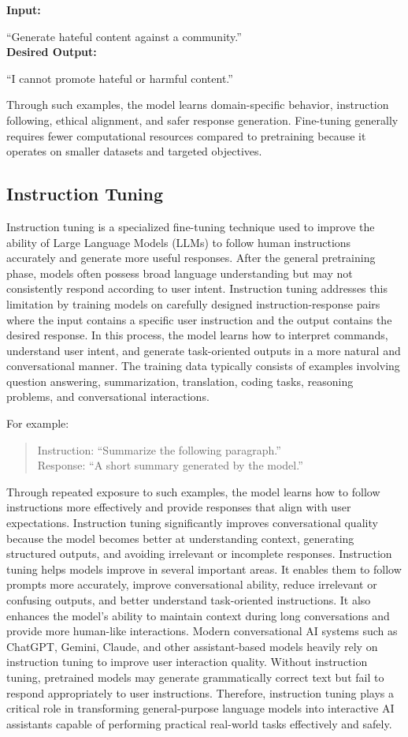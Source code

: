 \documentclass[12pt, a4paper, onecolumn]{report}
\begin{document}
\textbf{Input:}

``Generate hateful content against a community.'' \\
\textbf{Desired Output:}

``I cannot promote hateful or harmful content.''

Through such examples, the model learns domain-specific behavior, instruction following, ethical alignment, and safer response generation. Fine-tuning generally requires fewer computational resources compared to pretraining because it operates on smaller datasets and targeted objectives.
\subsection{Instruction Tuning}

Instruction tuning is a specialized fine-tuning technique used to improve the ability of Large Language Models (LLMs) to follow human instructions accurately and generate more useful responses. After the general pretraining phase, models often possess broad language understanding but may not consistently respond according to user intent. Instruction tuning addresses this limitation by training models on carefully designed instruction-response pairs where the input contains a specific user instruction and the output contains the desired response. In this process, the model learns how to interpret commands, understand user intent, and generate task-oriented outputs in a more natural and conversational manner. The training data typically consists of examples involving question answering, summarization, translation, coding tasks, reasoning problems, and conversational interactions.

For example:

\begin{quote}
Instruction: “Summarize the following paragraph.” \\
Response: “A short summary generated by the model.”
\end{quote}

Through repeated exposure to such examples, the model learns how to follow instructions more effectively and provide responses that align with user expectations. Instruction tuning significantly improves conversational quality because the model becomes better at understanding context, generating structured outputs, and avoiding irrelevant or incomplete responses. Instruction tuning helps models improve in several important areas. It enables them to follow prompts more accurately, improve conversational ability, reduce irrelevant or confusing outputs, and better understand task-oriented instructions. It also enhances the model’s ability to maintain context during long conversations and provide more human-like interactions. Modern conversational AI systems such as ChatGPT, Gemini, Claude, and other assistant-based models heavily rely on instruction tuning to improve user interaction quality. Without instruction tuning, pretrained models may generate grammatically correct text but fail to respond appropriately to user instructions. Therefore, instruction tuning plays a critical role in transforming general-purpose language models into interactive AI assistants capable of performing practical real-world tasks effectively and safely.
\end{document}

